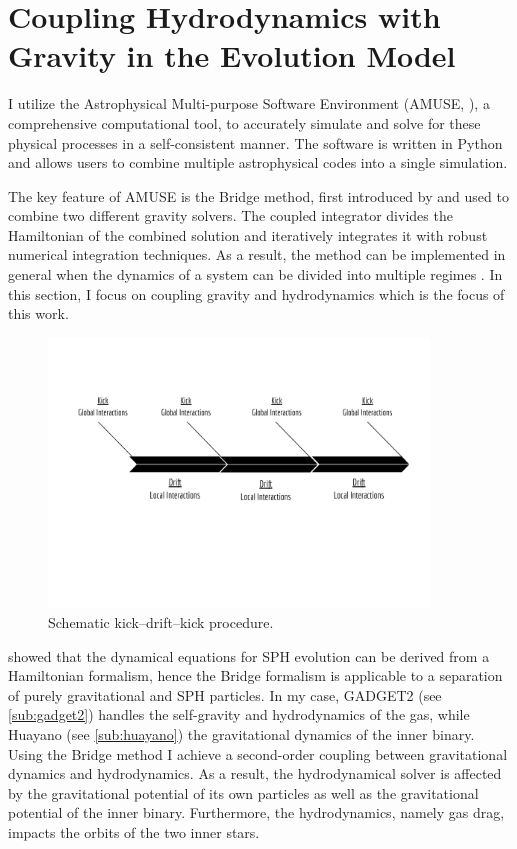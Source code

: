 \section{Coupling Hydrodynamics with Gravity in the Evolution Model}

I utilize the Astrophysical Multi-purpose Software Environment (AMUSE, \cite{pelupessy2013astrophysical,portegies2018astrophysical}), a comprehensive computational tool, to accurately simulate and solve for these physical processes in a self-consistent manner.  The software is written in Python and allows users to combine multiple astrophysical codes into a single simulation. 

The key feature of AMUSE is the Bridge method, first introduced by \cite{fujii2007bridge} and used to combine two different gravity solvers. The coupled integrator divides the Hamiltonian of the combined solution and iteratively integrates it with robust numerical integration techniques. As a result, the method can be implemented in general when the dynamics of a system can be divided into multiple regimes \citep{zwart2013multi}. In this section, I focus on coupling gravity and hydrodynamics which is the focus of this work.
\begin{figure}[H]
    \centering
    \includegraphics[width=0.9\textwidth]{Thesis/figures/kick_drift_kick.pdf}
    \caption{Schematic kick–drift–kick procedure.}
    \label{fig:kick_drift_kick}
\end{figure}
\cite{saitoh2010fast} showed that the dynamical equations for SPH evolution can be derived from a Hamiltonian formalism, hence the Bridge formalism is applicable to a separation of purely gravitational and SPH particles. In my case, GADGET2 (see \cref{sub:gadget2}) handles the self-gravity and hydrodynamics of the gas, while Huayano (see \cref{sub:huayano}) the gravitational dynamics of the inner binary. Using the Bridge method I achieve a second-order coupling between gravitational dynamics and hydrodynamics. As a result, the hydrodynamical solver is affected by the gravitational potential of its own particles as well as the gravitational potential of the inner binary. Furthermore, the hydrodynamics, namely gas drag, impacts the orbits of the two inner stars.

